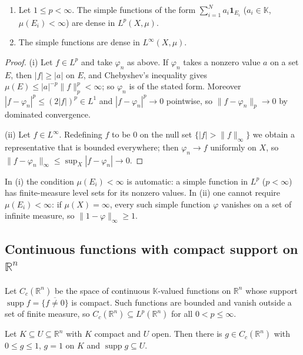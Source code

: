 \documentclass[11pt]{article}
\newcommand{\K}{\mathbb{K}}
\newcommand{\R}{\mathbb{R}}
\newcommand{\norm}[1]{\lVert #1\rVert}
\newcommand{\ind}{\mathbf{1}}
\DeclareMathOperator{\supp}{supp}
\begin{document}
\begin{theorem}\label{thm:simple-dense}
\begin{enumerate}
\item Let $1\le p<\infty$. The simple functions of the form $\sum_{i=1}^{N}a_{i}\ind_{E_{i}}$ ($a_{i}\in\K$, $\mu(E_{i})<\infty$) are dense in $L^{p}(X,\mu)$.
\item The simple functions are dense in $L^{\infty}(X,\mu)$.
\end{enumerate}
\end{theorem}

\begin{proof}
(i) Let $f\in L^{p}$ and take $\varphi_{n}$ as above. If $\varphi_{n}$ takes a nonzero value $a$ on a set $E$, then $|f|\ge|a|$ on $E$, and Chebyshev's inequality gives $\mu(E)\le|a|^{-p}\norm{f}_{p}^{p}<\infty$; so $\varphi_{n}$ is of the stated form. Moreover $|f-\varphi_{n}|^{p}\le(2|f|)^{p}\in L^{1}$ and $|f-\varphi_{n}|^{p}\to0$ pointwise, so $\norm{f-\varphi_{n}}_{p}\to0$ by dominated convergence.

(ii) Let $f\in L^{\infty}$. Redefining $f$ to be $0$ on the null set $\{|f|>\norm{f}_{\infty}\}$ we obtain a representative that is bounded everywhere; then $\varphi_{n}\to f$ uniformly on $X$, so $\norm{f-\varphi_{n}}_{\infty}\le\sup_{X}|f-\varphi_{n}|\to0$.
\end{proof}

\begin{remark}
In (i) the condition $\mu(E_{i})<\infty$ is automatic: a simple function in $L^{p}$ ($p<\infty$) has finite-measure level sets for its nonzero values. In (ii) one cannot require $\mu(E_{i})<\infty$: if $\mu(X)=\infty$, every such simple function $\varphi$ vanishes on a set of infinite measure, so $\norm{1-\varphi}_{\infty}\ge1$.
\end{remark}

\subsection{Continuous functions with compact support on $\R^{n}$}

Let $C_{c}(\R^{n})$ be the space of continuous $\K$-valued functions on $\R^{n}$ whose support $\supp f=\overline{\{f\ne0\}}$ is compact. Such functions are bounded and vanish outside a set of finite measure, so $C_{c}(\R^{n})\subseteq L^{p}(\R^{n})$ for all $0<p\le\infty$.

\begin{lemma}[Urysohn's lemma in $\R^{n}$]\label{lem:urysohn}
Let $K\subseteq U\subseteq\R^{n}$ with $K$ compact and $U$ open. Then there is $g\in C_{c}(\R^{n})$ with $0\le g\le1$, $g=1$ on $K$ and $\supp g\subseteq U$.
\end{lemma}
\end{document}
